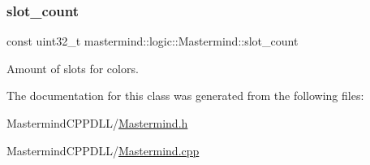 \subsubsection{\texorpdfstring{slot\+\_\+count}{slot\_count}}
{\footnotesize\ttfamily const uint32\+\_\+t mastermind\+::logic\+::\+Mastermind\+::slot\+\_\+count\hspace{0.3cm}{\ttfamily [private]}}



Amount of slots for colors. 



The documentation for this class was generated from the following files\+:\begin{DoxyCompactItemize}
\item 
Mastermind\+C\+P\+P\+D\+L\+L/\hyperlink{_mastermind_8h}{Mastermind.\+h}\item 
Mastermind\+C\+P\+P\+D\+L\+L/\hyperlink{_mastermind_8cpp}{Mastermind.\+cpp}\end{DoxyCompactItemize}

